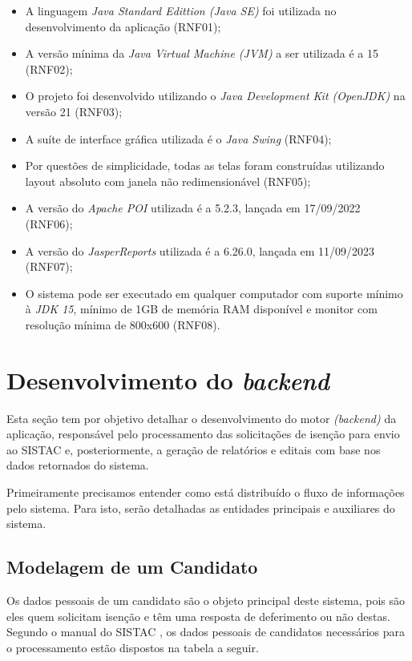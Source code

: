 \documentclass[
	12pt,			%
	openright,		%
	oneside,	
	a4paper,		%
	english,		%
	brazil			%
]{abntex2/abntex2}  %
\begin{document}
	\begin{itemize}
		
		\item A linguagem \textit{Java Standard Edittion (Java SE)} foi utilizada no desenvolvimento da aplicação (RNF01);
		\item A versão mínima da \textit{Java Virtual Machine (JVM)} a ser utilizada é a 15 (RNF02);
		\item O projeto foi desenvolvido utilizando o \textit{Java Development Kit (OpenJDK)} na versão 21 (RNF03);
		\item A suíte de interface gráfica utilizada é o \textit{Java Swing} (RNF04);
		\item Por questões de simplicidade, todas as telas foram construídas utilizando layout absoluto com janela não redimensionável (RNF05);
		\item A versão do \textit{Apache POI} utilizada é a 5.2.3, lançada em 17/09/2022 (RNF06);
		\item A versão do \textit{JasperReports\textregistered} utilizada é a 6.26.0, lançada em 11/09/2023 (RNF07);
		\item O sistema pode ser executado em qualquer computador com suporte mínimo à \textit{JDK 15}, mínimo de 1GB de memória RAM disponível e monitor com resolução mínima de 800x600 (RNF08).
		
	\end{itemize}

	\section{Desenvolvimento do \textit{backend}}
	
	Esta seção tem por objetivo detalhar o desenvolvimento do motor \textit{(backend)} da aplicação, responsável pelo processamento das solicitações de isenção para envio ao SISTAC e, posteriormente, a geração de relatórios e editais com base nos dados retornados do sistema.
	
	Primeiramente precisamos entender como está distribuído o fluxo de informações pelo sistema. Para isto, serão detalhadas as entidades principais e auxiliares do sistema.
	
	\subsection{Modelagem de um Candidato}
	
	Os dados pessoais de um candidato são o objeto principal deste sistema, pois são eles quem solicitam isenção e têm uma resposta de deferimento ou não destas. Segundo o manual do SISTAC \cite{sistac-formatos}, os dados pessoais de candidatos necessários para o processamento estão dispostos na tabela a seguir.
\end{document}
